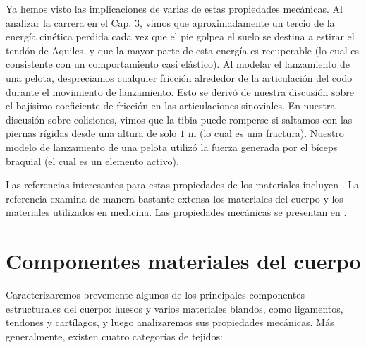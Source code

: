 \documentclass[12pt]{book}
\begin{document}
Ya hemos visto las implicaciones de varias de estas propiedades mecánicas. Al analizar la carrera en el Cap. 3, vimos que aproximadamente un tercio de la energía cinética perdida cada vez que el pie golpea el suelo se destina a estirar el tendón de Aquiles, y que la mayor parte de esta energía es recuperable (lo cual es consistente con un comportamiento casi elástico). Al modelar el lanzamiento de una pelota, despreciamos cualquier fricción alrededor de la articulación del codo durante el movimiento de lanzamiento. Esto se derivó de nuestra discusión sobre el bajísimo coeficiente de fricción en las articulaciones sinoviales. En nuestra discusión sobre colisiones, vimos que la tibia puede romperse si saltamos con las piernas rígidas desde una altura de solo $1\text{ m}$ (lo cual es una fractura). Nuestro modelo de lanzamiento de una pelota utilizó la fuerza generada por el bíceps braquial (el cual es un elemento activo).

Las referencias interesantes para estas propiedades de los materiales incluyen \cite{6,8,9,22,27,31,45,47,56,57,59,61}. La referencia \cite{64} examina de manera bastante extensa los materiales del cuerpo y los materiales utilizados en medicina. Las propiedades mecánicas se presentan en \cite{1,17,79}.

\section{Componentes materiales del cuerpo}

Caracterizaremos brevemente algunos de los principales componentes estructurales del cuerpo: huesos y varios materiales blandos, como ligamentos, tendones y cartílagos, y luego analizaremos sus propiedades mecánicas. Más generalmente, existen cuatro categorías de tejidos:
\end{document}
